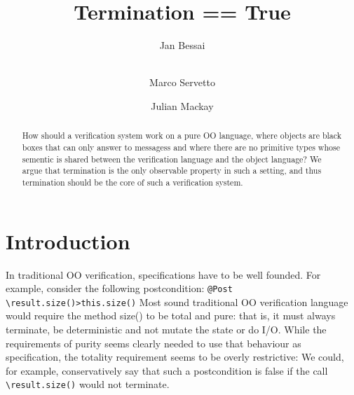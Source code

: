 \documentclass[runningheads]{llncs}
\newcommand{\Q}{\lstinline}
\begin{document}
%
\title{Termination == True }
%
%
\author{Jan Bessai \and\\
Marco Servetto \and
Julian Mackay}
%



%

%
\maketitle              %
%
\begin{abstract}
How should a verification system work on a pure OO language, where objects are black boxes that can only answer to messagess and where there are no primitive types whose sementic is shared between the verification language and the object language?
We argue that termination is the only observable property in such a setting, and thus termination should be the core of such a verification system.


\end{abstract}
%
%
%
\section{Introduction}

In traditional OO verification, specifications have to be well founded.
For example, consider the following postcondition:
\Q!@Post \result.size()>this.size()!
Most sound traditional OO verification language would require the method size() to be total and pure: that is, it must always terminate, be deterministic and not mutate the state or do I/O.
While the requirements of purity seems clearly needed to use that behaviour as specification, the totality requirement seems to be overly restrictive:
We could, for example, conservatively say that such a postcondition is false if the call \Q!\result.size()! would not terminate.
\end{document}

